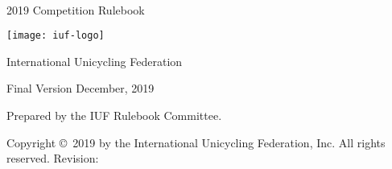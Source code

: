 \begin{titlepage}
\centering
\ \\
\vspace{5cm}
{\Huge 2019 Competition Rulebook}
\vspace{5mm}

\texttt{[image: iuf-logo]}

\vspace{5mm}
{\huge International Unicycling Federation}

\vspace{5mm}
{\Large Final Version \quad December, 2019}

\vspace{45mm}
Prepared by the IUF Rulebook Committee.

\vspace{5mm}
{\small Copyright \copyright\ 2019 by the International Unicycling Federation, Inc. All rights reserved.}
\small{Revision: \href{https://github.com/iuf/rulebook/commit/\gitHash}{\gitAbbrevHash} \ \gitCommitterDate}

\end{titlepage}
